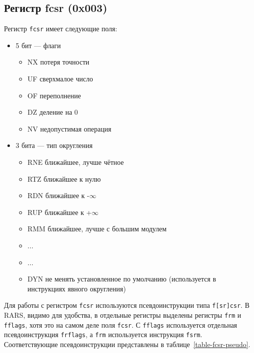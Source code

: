 \subsection{Регистр fcsr (0x003)}

Регистр \verb|fcsr| имеет следующие поля:

\begin{itemize}
    \item 5 бит --- флаги
    \begin{itemize}
        \item NX потеря точности
        \item UF сверхмалое число
        \item OF переполнение
        \item DZ деление на 0
        \item NV недопустимая операция
    \end{itemize}
    \item 3 бита --- тип округления
    \begin{itemize}
        \item RNE ближайшее, лучше чётное
        \item RTZ ближайшее к нулю
        \item RDN ближайшее к -$\infty$
        \item RUP ближайшее к +$\infty$
        \item RMM ближайшее, лучше с большим модулем
        \item ...
        \item ...
        \item DYN не менять установленное по умолчанию (используется в инструкциях явного округления)
    \end{itemize}
\end{itemize}
Для работы с регистром \verb|fcsr| используются псевдоинструкции типа \verb|f[sr]csr|. В RARS, видимо для удобства,  в отдельные регистры выделены регистры \verb|frm| и \verb|fflags|, хотя это на самом деле поля \verb|fcsr|. С \verb|fflags| используется отдельная псевдоинструкция \verb|frflags|, а \verb|frm| используется инструкция \verb|fsrm|. Соответствующие псевдоинструкции представлены в таблице~\ref{table-fcsr-pseudo}.

